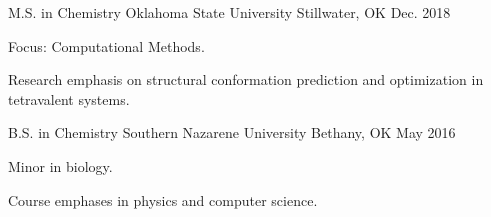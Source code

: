 

\begin{cventries}

  \cventry
    {M.S. in Chemistry} %
    {Oklahoma State University} %
    {Stillwater, OK} %
    {Dec. 2018} %
    {
      \begin{cvitems} %
		\item{Focus:  Computational Methods.}
		\item{Research emphasis on structural conformation prediction and optimization in tetravalent systems.}
      \end{cvitems}
    }

\cventry
{B.S. in Chemistry} %
{Southern Nazarene University} %
{Bethany, OK} %
{May 2016} %
{
	\begin{cvitems} %
		\item {Minor in biology.}
		\item {Course emphases in physics and computer science.}
	\end{cvitems}
}

\end{cventries}
